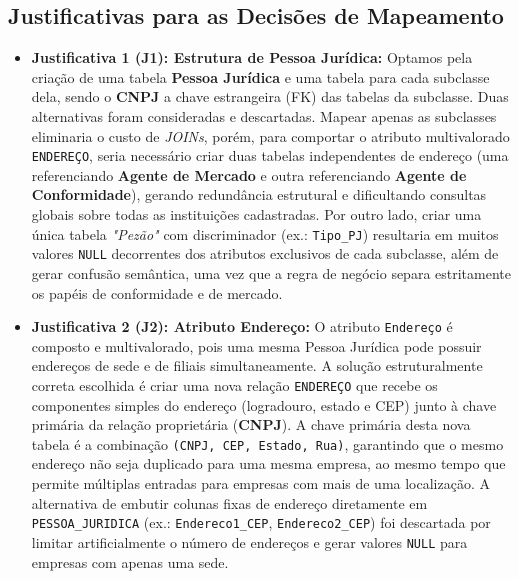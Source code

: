 \documentclass[12pt]{article}
\begin{document}
\clearpage
 
\subsection{Justificativas para as Decisões de Mapeamento}
 
\begin{itemize}
 
    \item \textbf{Justificativa 1 (J1): Estrutura de Pessoa Jurídica:}
    Optamos pela criação de uma tabela \textbf{Pessoa Jurídica} e uma tabela para cada subclasse dela, sendo o \textbf{CNPJ} a chave estrangeira (FK) das tabelas da subclasse. Duas alternativas foram consideradas e descartadas. Mapear apenas as subclasses eliminaria o custo de \textit{JOINs}, porém, para comportar o atributo multivalorado \texttt{ENDEREÇO}, seria necessário criar duas tabelas independentes de endereço (uma referenciando \textbf{Agente de Mercado} e outra referenciando \textbf{Agente de Conformidade}), gerando redundância estrutural e dificultando consultas globais sobre todas as instituições cadastradas. Por outro lado, criar uma única tabela \textit{"Pezão"} com discriminador (ex.: \texttt{Tipo\_PJ}) resultaria em muitos valores \texttt{NULL} decorrentes dos atributos exclusivos de cada subclasse, além de gerar confusão semântica, uma vez que a regra de negócio separa estritamente os papéis de conformidade e de mercado.
 
    \item \textbf{Justificativa 2 (J2): Atributo Endereço:}
    O atributo \texttt{Endereço} é composto e multivalorado, pois uma mesma Pessoa Jurídica pode possuir endereços de sede e de filiais simultaneamente. A solução estruturalmente correta escolhida é criar uma nova relação \texttt{ENDEREÇO} que recebe os componentes simples do endereço (logradouro, estado e CEP) junto à chave primária da relação proprietária (\textbf{CNPJ}). A chave primária desta nova tabela é a combinação \texttt{(CNPJ, CEP, Estado, Rua)}, garantindo que o mesmo endereço não seja duplicado para uma mesma empresa, ao mesmo tempo que permite múltiplas entradas para empresas com mais de uma localização. A alternativa de embutir colunas fixas de endereço diretamente em \texttt{PESSOA\_JURIDICA} (ex.: \texttt{Endereco1\_CEP}, \texttt{Endereco2\_CEP}) foi descartada por limitar artificialmente o número de endereços e gerar valores \texttt{NULL} para empresas com apenas uma sede.
 

\end{itemize}
\end{document}
